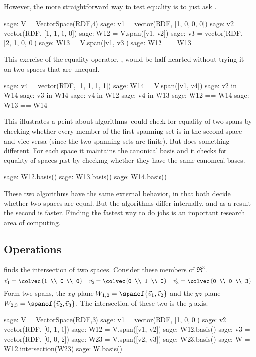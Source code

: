 However, the more straightforward way to test equality is to just ask \Sage{}.
\begin{sagecommandline}
sage: V = VectorSpace(RDF,4)
sage: v1 = vector(RDF, [1, 0, 0, 0])
sage: v2 = vector(RDF, [1, 1, 0, 0])
sage: W12 = V.span([v1, v2])
sage: v3 = vector(RDF, [2, 1, 0, 0])
sage: W13 = V.span([v1, v3])  
sage: W12 == W13
\end{sagecommandline}
\noindent
This exercise of the equality operator, \inlinecode{==}, 
would be half-hearted without trying it on two spaces that are
unequal. 
\begin{sagecommandline}
sage: v4 = vector(RDF, [1, 1, 1, 1])
sage: W14 = V.span([v1, v4])
sage: v2 in W14
sage: v3 in W14                                 
sage: v4 in W12
sage: v4 in W13
sage: W12 == W14                                                              
sage: W13 == W14
\end{sagecommandline}

This illustrates a point about algorithms.
\Sage{} could check for equality of two spans 
by checking whether every member of the first spanning set is in the
second space and vice versa (since the two spanning sets are finite). 
But \Sage{} does something different.
For each space it maintains the canonical basis
and it checks for equality of spaces
just by checking whether they have the same canonical bases.
\begin{sagecommandline}
sage: W12.basis()
sage: W13.basis()
sage: W14.basis()
\end{sagecommandline}
These two algorithms 
have the same external behavior, in that both decide whether
two spaces are equal.
But the algorithms differ internally, and as a result the second is faster.
Finding the fastest way to do jobs is an important research area of computing.


\subsection{Operations}
\Sage{} finds the intersection of two spaces.
Consider these members of $\Re^3$.
\begin{equation*}
  \vec{v}_1=\colvec{1 \\ 0 \\ 0}
  \quad \vec{v}_2=\colvec{0 \\ 1 \\ 0}
  \quad \vec{v}_3=\colvec{0 \\ 0 \\ 3}
\end{equation*}
Form two spans, the $xy$-plane $W_{1,2}=\spanof{\vec{v}_1, \vec{v}_2}$ 
and the $yz$-plane $W_{2,3}=\spanof{\vec{v}_2, \vec{v}_3}$.
The intersection of these two is the $y$-axis. 
\begin{sagecommandline}
sage: V = VectorSpace(RDF,3)
sage: v1 = vector(RDF, [1, 0, 0])
sage: v2 =  vector(RDF, [0, 1, 0])
sage: W12 = V.span([v1, v2])
sage: W12.basis()
sage: v3 = vector(RDF, [0, 0, 2])
sage: W23 = V.span([v2, v3])
sage: W23.basis()
sage: W = W12.intersection(W23)
sage: W.basis()
\end{sagecommandline}

